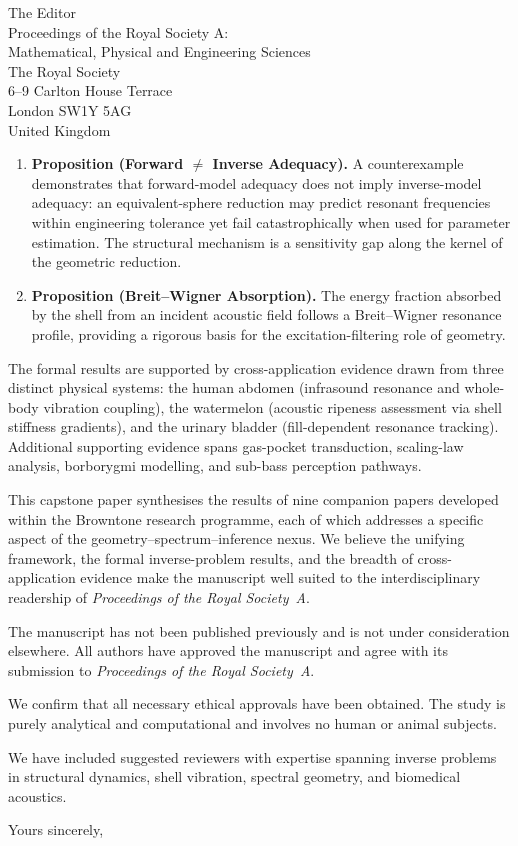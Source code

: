 \documentclass[12pt]{letter}
\begin{document}
\begin{letter}{The Editor\\
Proceedings of the Royal Society A:\\
Mathematical, Physical and Engineering Sciences\\
The Royal Society\\
6--9 Carlton House Terrace\\
London SW1Y 5AG\\
United Kingdom}
\begin{enumerate}
  \item \textbf{Proposition (Forward $\neq$ Inverse Adequacy).} A counterexample
    demonstrates that forward-model adequacy does not imply inverse-model
    adequacy: an equivalent-sphere reduction may predict resonant frequencies
    within engineering tolerance yet fail catastrophically when used for
    parameter estimation.  The structural mechanism is a sensitivity gap along
    the kernel of the geometric reduction.

  \item \textbf{Proposition (Breit--Wigner Absorption).} The energy fraction
    absorbed by the shell from an incident acoustic field follows a
    Breit--Wigner resonance profile, providing a rigorous basis for the
    excitation-filtering role of geometry.
\end{enumerate}

The formal results are supported by cross-application evidence drawn from three
distinct physical systems: the human abdomen (infrasound resonance and
whole-body vibration coupling), the watermelon (acoustic ripeness assessment via
shell stiffness gradients), and the urinary bladder (fill-dependent resonance
tracking).  Additional supporting evidence spans gas-pocket transduction,
scaling-law analysis, borborygmi modelling, and sub-bass perception pathways.

This capstone paper synthesises the results of nine companion papers developed
within the Browntone research programme, each of which addresses a specific
aspect of the geometry--spectrum--inference nexus.  We believe the unifying
framework, the formal inverse-problem results, and the breadth of
cross-application evidence make the manuscript well suited to the
interdisciplinary readership of \emph{Proceedings of the Royal Society~A}.

The manuscript has not been published previously and is not under consideration
elsewhere.  All authors have approved the manuscript and agree with its
submission to \emph{Proceedings of the Royal Society~A}.

We confirm that all necessary ethical approvals have been obtained.  The study
is purely analytical and computational and involves no human or animal subjects.

We have included suggested reviewers with expertise spanning inverse problems
in structural dynamics, shell vibration, spectral geometry, and biomedical
acoustics.

\closing{Yours sincerely,}

\end{letter}
\end{document}
